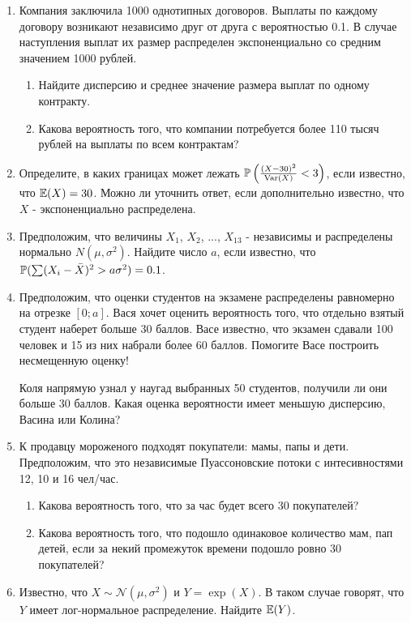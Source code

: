 \documentclass[12pt, a4paper]{article}\usepackage[]{graphicx}\usepackage[]{color}
\begin{document}
\begin{enumerate}
\item Компания заключила 1000 однотипных договоров. Выплаты по каждому договору возникают независимо друг от друга с вероятностью 0.1. В случае наступления выплат их размер распределен экспоненциально со средним значением 1000 рублей.
\begin{enumerate}
\item Найдите дисперсию и среднее значение размера выплат по одному контракту.
\item Какова вероятность того, что компании потребуется более 110 тысяч рублей на выплаты по всем контрактам?
\end{enumerate}

\item Определите, в каких границах может лежать $\P\left(\frac{(X-30)^{2}}{\Var(X)}<3\right)$, если известно, что $\E(X)=30$. Можно ли уточнить ответ, если дополнительно известно, что $X$ - экспоненциально распределена.

\item Предположим, что величины $X_{1}$, $X_{2}$, ..., $X_{13}$ - независимы и распределены нормально $N(\mu,\sigma^{2})$. Найдите число $a$, если известно, что $\P( \sum (X_{i}-\bar{X})^{2}>a\sigma^{2})=0.1$.
\item Предположим, что оценки студентов на экзамене распределены равномерно на отрезке $[0;a]$. Вася хочет оценить вероятность того, что отдельно взятый студент наберет больше 30 баллов. Васе известно, что экзамен сдавали 100 человек и 15 из них набрали более 60 баллов. Помогите Васе построить несмещенную оценку!

Коля напрямую узнал у наугад выбранных 50 студентов, получили ли они больше 30 баллов. Какая оценка вероятности имеет меньшую дисперсию, Васина или Колина?


\item К продавцу мороженого подходят покупатели: мамы, папы и дети. Предположим, что это независимые Пуассоновские потоки с интесивностями 12, 10 и 16 чел/час.
\begin{enumerate}
\item Какова вероятность того, что за час будет всего 30 покупателей?
\item Какова вероятность того, что подошло одинаковое количество мам, пап детей, если за некий промежуток времени подошло ровно 30 покупателей?
\end{enumerate}

\item Известно, что $X\sim \mathcal{N}(\mu,\sigma^{2})$ и $Y=\exp(X)$. В таком случае говорят, что $Y$ имеет лог-нормальное распределение. Найдите $\E(Y)$.
\end{enumerate}
\end{document}
